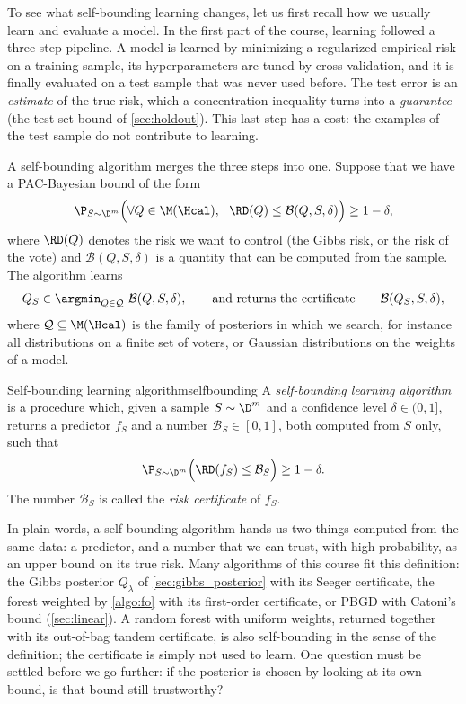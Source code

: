 To see what self-bounding learning changes, let us first recall how we usually
learn and evaluate a model. In the first part of the course, learning followed
a three-step pipeline. A model is learned by minimizing a regularized empirical risk on a training
sample, its hyperparameters are tuned by cross-validation, and it is finally
evaluated on a test sample that was never used before. The test error is an
\emph{estimate} of the true risk, which a concentration inequality turns into a
\emph{guarantee} (the test-set bound of \cref{sec:holdout}). This last step has a
cost: the examples of the test sample do not contribute to learning.

A self-bounding algorithm merges the three steps into one. Suppose that we have a
PAC-Bayesian bound of the form
\[
\P_{S\sim\D^m}\Big(\forall Q\in\M(\Hcal),\ \ \RD(Q)\leq\mathcal B(Q,S,\delta)\Big)\geq1-\delta,
\]
where $\RD(Q)$ denotes the risk we want to control (the Gibbs risk, or the
risk of the vote) and $\mathcal B(Q,S,\delta)$ is a quantity that can be computed
from the sample. The algorithm learns
\begin{equation}\label{eq:sb_principle}
Q_S\in\argmin_{Q\in\mathcal Q}\ \mathcal B(Q,S,\delta),
\qquad\text{and returns the certificate}\qquad \mathcal B(Q_S,S,\delta),
\end{equation}
where $\mathcal Q\subseteq\M(\Hcal)$ is the family of posteriors in which we
search, for instance all distributions on a finite set of voters, or Gaussian
distributions on the weights of a model.

\begin{definition}{Self-bounding learning algorithm}{selfbounding}
A \emph{self-bounding learning algorithm} is a procedure which, given a sample
$S\sim\D^m$ and a confidence level $\delta\in(0,1]$, returns a predictor $f_S$ and a
number $\mathcal B_S\in[0,1]$, both computed from $S$ only, such that
\[
\P_{S\sim\D^m}\Big(\RD(f_S)\leq\mathcal B_S\Big)\geq1-\delta.
\]
The number $\mathcal B_S$ is called the \emph{risk certificate} of $f_S$.
\end{definition}

In plain words, a self-bounding algorithm hands us two things computed from the
same data: a predictor, and a number that we can trust, with high probability,
as an upper bound on its true risk. Many algorithms of this course fit this
definition: the Gibbs posterior
$Q_\lambda$ of \cref{sec:gibbs_posterior} with its Seeger certificate, the
forest weighted by \cref{algo:fo} with its first-order certificate, or PBGD with
Catoni's bound (\cref{sec:linear}). A random forest with uniform weights,
returned together with its out-of-bag tandem certificate, is also
self-bounding in the sense of the definition; the certificate is simply not used
to learn. One question must be settled before we go further: if the posterior is
chosen by looking at its own bound, is that bound still trustworthy?

